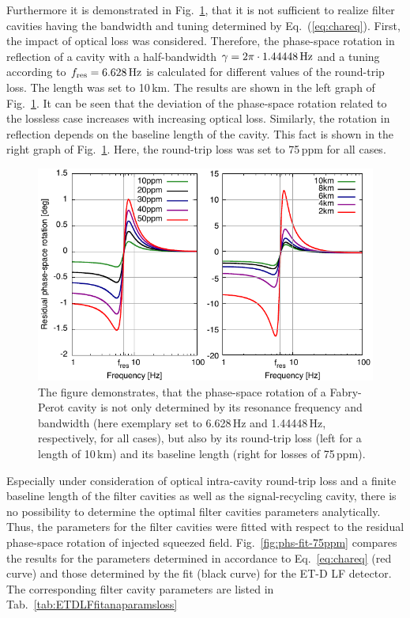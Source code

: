 Furthermore it is demonstrated in Fig.~\ref{fig:phs-vs-loss}, that it is not sufficient to realize filter cavities having the bandwidth and tuning determined by Eq.~(\ref{eq:chareq}).   First, the impact of optical loss was considered. Therefore, the phase-space rotation in reflection of a cavity with a half-bandwidth $\gamma=2\pi\cdot1.44448\,\rm Hz$ and a tuning according  to $f_{\rm res} = 6.628\,\rm Hz$ is calculated for different values of the round-trip loss. The length was set to 10\,km. The results are shown in the left graph of Fig.~\ref{fig:phs-vs-loss}. It can be seen that the deviation of the phase-space rotation related to the lossless case increases with increasing optical loss. Similarly, the rotation in reflection depends on the baseline length of the cavity. This fact is shown in the right graph of Fig.~\ref{fig:phs-vs-loss}. Here, the round-trip loss was set to 75\,ppm for all cases.


 \begin{figure}
 \centering
   \includegraphics{./Sec_Optics/PhsRot-residualsAI.pdf}
   \caption{The figure demonstrates, that the phase-space rotation of a Fabry-Perot cavity is not only determined by its resonance frequency and bandwidth (here exemplary set to 6.628\,Hz and 1.44448\,Hz, respectively, for all cases), but also by its round-trip loss (left for a length of 10\,km) and its baseline length (right for losses of 75\,ppm).}
   \label{fig:phs-vs-loss}
   \end{figure}


Especially under consideration of optical intra-cavity round-trip loss and a finite baseline length of the filter cavities as well as the signal-recycling cavity,
there is no possibility to determine the optimal filter cavities parameters analytically. Thus, the parameters for the filter cavities were fitted with respect to the residual phase-space rotation of injected squeezed field. Fig.~\ref{fig:phs-fit-75ppm} compares the results for the parameters determined in accordance to Eq.~\ref{eq:chareq} (red curve) and those determined by the fit (black curve) for the ET-D LF detector. The corresponding filter cavity parameters are listed in Tab.~\ref{tab:ETDLFfitanaparamsloss}

